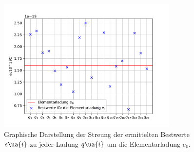 \begin{figure}[H]
  \centering
  \includegraphics[width = 0.8\textwidth]{../Messdaten/scattering.pdf}
  \caption{Graphische Darstellung der Streung der ermittelten Bestwerte $e\ua{i}$ zu jeder Ladung $q\ua{i}$ um die Elementarladung $e_0$.}
  \label{fig: streuung}
\end{figure}
